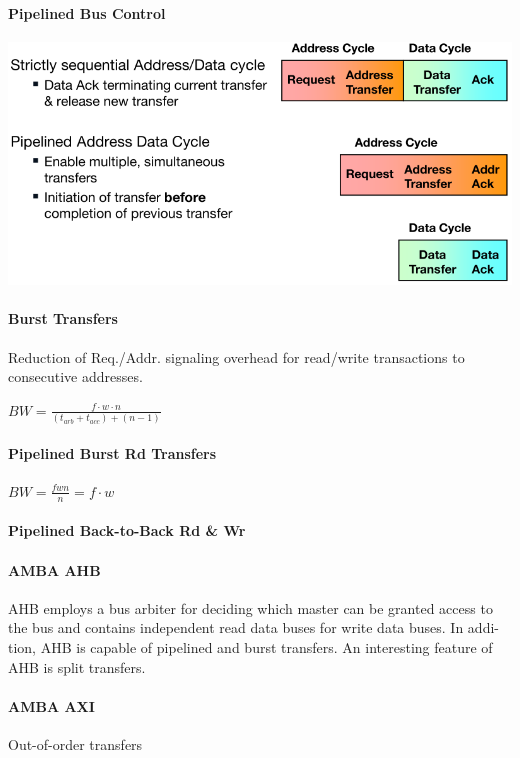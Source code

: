 \documentclass[english]{latex4ei/latex4ei_sheet}
\begin{document}
\paragraph{Pipelined Bus Control}
\begin{center}
    \centering
    \includegraphics[width=0.75\linewidth]{images//6.Interconnects/PipelinedBusControl.png}
\end{center}

\paragraph{Burst Transfers} Reduction of Req./Addr. signaling overhead for read/write transactions to consecutive addresses.

$BW = \frac{f \cdot w \cdot n}{(t_{arb} + t_{acc}) + (n - 1)}$
\paragraph{Pipelined Burst Rd Transfers}

$BW = \frac{f w n}{n} = f \cdot w$

\paragraph{Pipelined Back-to-Back Rd \& Wr}

\paragraph{AMBA AHB} AHB employs a bus arbiter for deciding which master can be granted
access to the bus and contains independent read data buses for write data buses. In addi-
tion, AHB is capable of pipelined and burst transfers. An interesting feature of AHB is split
transfers.

\paragraph{AMBA AXI} Out-of-order transfers
\end{document}
